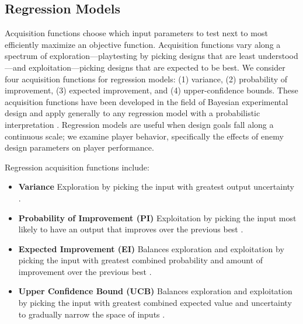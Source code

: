 \documentclass{sig-alternate}
\begin{document}
\subsection{Regression Models}
Acquisition functions choose which input parameters to test next to most efficiently maximize an objective function.
Acquisition functions vary along a spectrum of exploration---playtesting by picking designs that are least understood---and exploitation---picking designs that are expected to be best.
We consider four acquisition functions for regression models: (1) variance, (2) probability of improvement, (3) expected improvement, and (4) upper-confidence bounds.
These acquisition functions have been developed in the field of Bayesian experimental design and apply generally to any regression model with a probabilistic interpretation \cite{brochu2010:thesis, chaloner1995}.
Regression models are useful when design goals fall along a continuous scale; we examine player behavior, specifically the effects of enemy design parameters on player performance.


Regression acquisition functions include:
\begin{itemize}
%
\item \textbf{Variance} Exploration by picking the input with greatest output uncertainty \cite{brochu2010:thesis}.
%
\item \textbf{Probability of Improvement (PI)} Exploitation by picking the input most likely to have an output that improves over the previous best \cite{brochu2010:thesis}.
%
\item \textbf{Expected Improvement (EI)} Balances exploration and exploitation by picking the input with greatest combined probability and amount of improvement over the previous best \cite{brochu2010:thesis}.
%
\item \textbf{Upper Confidence Bound (UCB)}
Balances exploration and exploitation by picking the input with greatest combined expected value and uncertainty to gradually narrow the space of inputs \cite{srinivas2010:gp-ucb}.
\end{itemize}
\end{document}
